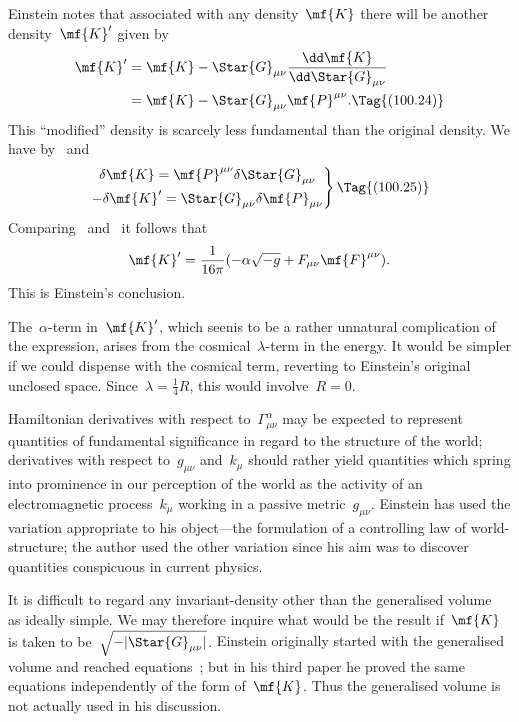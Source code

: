 \documentclass[12pt]{book}
\begin{document}
Einstein notes that associated with any density~$\mf{K}$ there will be another density~$\mf{K}'$ given by
\begin{align*}
\mf{K}' & = \mf{K} - \Star{G}_{\mu\nu} \frac{\dd\mf{K}}{\dd\Star{G}_{\mu\nu}}\\
        & = \mf{K} - \Star{G}_{\mu\nu} \mf{P}^{\mu\nu}.
\Tag{(100.24)}
\end{align*}
This ``modified'' density is scarcely less fundamental than the original density.
We have by~ and~
\[
\left.
\begin{gathered}
  \delta\mf{K}   = \mf{P}^{\mu\nu}   \delta\Star{G}_{\mu\nu}\\
- \delta\mf{K}'  = \Star{G}_{\mu\nu} \delta\mf{P}_{\mu\nu}
\end{gathered}
\right\}
\Tag{(100.25)}
\]
Comparing~ and~ it follows that
\[
\mf{K}' = \frac{1}{16\pi}(-\alpha\sqrt{-g} + F_{\mu\nu}\mf{F}^{\mu\nu}).
\]
This is Einstein's conclusion.

The~$\alpha$\hyp{}term in~$\mf{K}'$, which seenis to be a rather unnatural complication of the expression,
arises from the cosmical~$\lambda$\hyp{}term in the energy.
It would be simpler if we could dispense with the cosmical term, reverting to Einstein's original unclosed space.
Since~$\lambda=\tfrac{1}{4}R$, this would involve~$R=0$.

Hamiltonian derivatives with respect to~$\Gamma^\alpha_{\mu\nu}$ may be expected to represent quantities of
fundamental significance in regard to the structure of the world;
derivatives with respect to~$g_{\mu\nu}$ and~$k_\mu$ should rather yield quantities which spring into prominence
in our perception of the world as the activity of an electromagnetic process~$k_\mu$ working in a passive
metric~$g_{\mu\nu}$.
Einstein has used the variation appropriate to his object---the formulation of a controlling law of
world\hyp{}structure;
the author used the other variation since his aim was to discover quantities conspicuous in current physics.

It is difficult to regard any invariant\hyp{}density other than the generalised volume~ as ideally simple.
We may therefore inquire what would be the result if~$\mf{K}$ is taken to
be~$\sqrt{-|\Star{G}_{\mu\nu}|}$\footnotemark.\footnotetext
         {Einstein originally started with the generalised volume and reached equations~;
          but in his third paper he proved the same equations independently of the form of~$\mf{K}$.
          Thus the generalised volume is not actually used in his discussion.}
\end{document}

